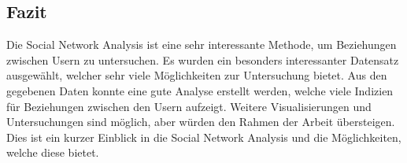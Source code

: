 \documentclass[
]{article}
\begin{document}
\subsection{Fazit}\label{fazit}

Die Social Network Analysis ist eine sehr interessante Methode, um
Beziehungen zwischen Usern zu untersuchen. Es wurden ein besonders
interessanter Datensatz ausgewählt, welcher sehr viele Möglichkeiten zur
Untersuchung bietet. Aus den gegebenen Daten konnte eine gute Analyse
erstellt werden, welche viele Indizien für Beziehungen zwischen den
Usern aufzeigt. Weitere Visualisierungen und Untersuchungen sind
möglich, aber würden den Rahmen der Arbeit übersteigen. Dies ist ein
kurzer Einblick in die Social Network Analysis und die Möglichkeiten,
welche diese bietet.
\end{document}
